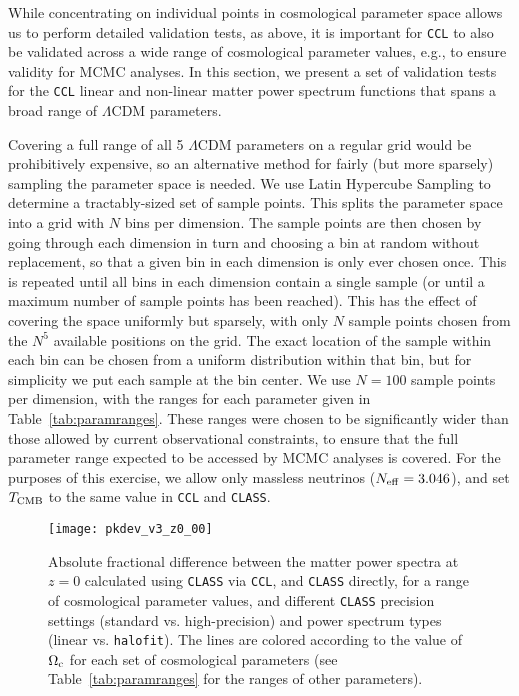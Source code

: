 \documentclass[\docopts]{\docclass}
\newcommand{\ccl}{{\tt CCL}\xspace}
\newcommand{\halofit}{{\tt halofit}\xspace}
\newcommand{\class}{{\tt CLASS}\xspace}
\begin{document}
While concentrating on individual points in cosmological parameter space allows us to perform detailed validation tests, as above, it is important for \ccl to also be validated across a wide range of cosmological parameter values, e.g., to ensure validity for MCMC analyses. In this section, we present a set of validation tests for the \ccl linear and non-linear matter power spectrum functions that spans a broad range of $\Lambda$CDM parameters.

Covering a full range of all 5 $\Lambda$CDM parameters on a regular grid would be prohibitively expensive, so an alternative method for fairly (but more sparsely) sampling the parameter space is needed. We use Latin Hypercube Sampling to determine a tractably-sized set of sample points. This splits the parameter space into a grid with $N$ bins per dimension. The sample points are then chosen by going through each dimension in turn and choosing a bin at random without replacement, so that a given bin in each dimension is only ever chosen once. This is repeated until all bins in each dimension contain a single sample (or until a maximum number of sample points has been reached). This has the effect of covering the space uniformly but sparsely, with only $N$ sample points chosen from the $N^5$ available positions on the grid. The exact location of the sample within each bin can be chosen from a uniform distribution within that bin, but for simplicity we put each sample at the bin center. We use $N=100$ sample points per dimension, with the ranges for each parameter given in Table~\ref{tab:paramranges}. These ranges were chosen to be significantly wider than those allowed by current observational constraints, to ensure that the full parameter range expected to be accessed by MCMC analyses is covered. For the purposes of this exercise, we allow only massless neutrinos ($N_{\rm eff} = 3.046$), and set $T_{\rm CMB}$ to the same value in \ccl and \class.

\begin{figure*}
\centering
\texttt{[image: pkdev\_v3\_z0\_00]}
\caption{Absolute fractional difference between the matter power spectra at $z=0$ calculated using \class via \ccl, and \class directly, for a range of cosmological parameter values, and different \class precision settings (standard vs. high-precision) and power spectrum types (linear vs. \halofit). The lines are colored according to the value of $\Omega_{\rm c}$ for each set of cosmological parameters (see Table~\ref{tab:paramranges} for the ranges of other parameters). }
\label{fig:power_paramspace}
\end{figure*}
%

\end{document}
